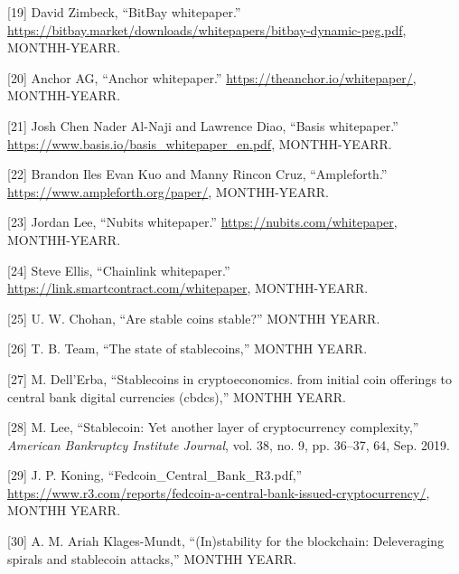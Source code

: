 \documentclass[english,]{IEEEtran}
\begin{document}
\hypertarget{ref-BitBay:whitepaper}{}
{[}19{]} David Zimbeck, ``BitBay whitepaper.''
\url{https://bitbay.market/downloads/whitepapers/bitbay-dynamic-peg.pdf},
MONTHH-YEARR.

\hypertarget{ref-Anchor:whitepaper}{}
{[}20{]} Anchor AG, ``Anchor whitepaper.''
\url{https://theanchor.io/whitepaper/}, MONTHH-YEARR.

\hypertarget{ref-Basis:whitepaper}{}
{[}21{]} Josh Chen Nader Al-Naji and Lawrence Diao, ``Basis
whitepaper.'' \url{https://www.basis.io/basis_whitepaper_en.pdf},
MONTHH-YEARR.

\hypertarget{ref-Ampleforth:whitepaper}{}
{[}22{]} Brandon Iles Evan Kuo and Manny Rincon Cruz, ``Ampleforth.''
\url{https://www.ampleforth.org/paper/}, MONTHH-YEARR.

\hypertarget{ref-Nubits:whitepaper}{}
{[}23{]} Jordan Lee, ``Nubits whitepaper.''
\url{https://nubits.com/whitepaper}, MONTHH-YEARR.

\hypertarget{ref-Chainlink:whitepaper}{}
{[}24{]} Steve Ellis, ``Chainlink whitepaper.''
\url{https://link.smartcontract.com/whitepaper}, MONTHH-YEARR.

\hypertarget{ref-Are_Stable_Coins_Stable}{}
{[}25{]} U. W. Chohan, ``Are stable coins stable?'' MONTHH YEARR.

\hypertarget{ref-THE_STATE_OF_STABLECOINS}{}
{[}26{]} T. B. Team, ``The state of stablecoins,'' MONTHH YEARR.

\hypertarget{ref-Stablecoins_in_Cryptoeconomics}{}
{[}27{]} M. Dell'Erba, ``Stablecoins in cryptoeconomics. from initial
coin offerings to central bank digital currencies (cbdcs),'' MONTHH
YEARR.

\hypertarget{ref-Stablecoin:_Yet_Another_Layer_of_Cryptocurrency_Complexity}{}
{[}28{]} M. Lee, ``Stablecoin: Yet another layer of cryptocurrency
complexity,'' \emph{American Bankruptcy Institute Journal}, vol. 38, no.
9, pp. 36--37, 64, Sep. 2019.

\hypertarget{ref-Fedcoin}{}
{[}29{]} J. P. Koning, ``Fedcoin\_Central\_Bank\_R3.pdf,''
\url{https://www.r3.com/reports/fedcoin-a-central-bank-issued-cryptocurrency/},
MONTHH YEARR.

\hypertarget{ref-In_stability_for_the_Blockchain}{}
{[}30{]} A. M. Ariah Klages-Mundt, ``(In)stability for the blockchain:
Deleveraging spirals and stablecoin attacks,'' MONTHH YEARR.
\end{document}
